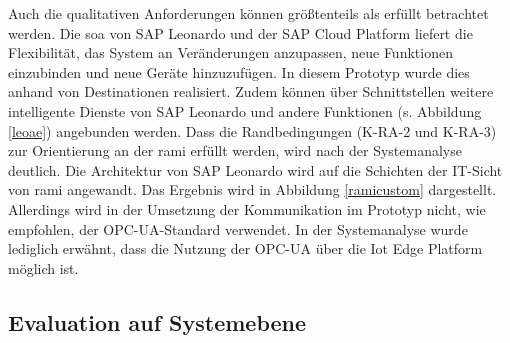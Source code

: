 Auch die qualitativen Anforderungen können größtenteils als erfüllt betrachtet werden. Die \ac{soa} von SAP Leonardo und der SAP Cloud Platform liefert die Flexibilität, das System an Veränderungen anzupassen, neue Funktionen einzubinden und neue Geräte hinzuzufügen. In diesem Prototyp wurde dies anhand von Destinationen realisiert. Zudem können über Schnittstellen weitere intelligente Dienste von SAP Leonardo und andere Funktionen (s. Abbildung \ref{leoae}) angebunden werden. Dass die Randbedingungen (K-RA-2 und K-RA-3) zur Orientierung an der \ac{rami} erfüllt werden, wird nach der Systemanalyse deutlich. Die Architektur von SAP Leonardo wird auf die Schichten der IT-Sicht von \ac{rami} angewandt. Das Ergebnis wird in Abbildung \ref{ramicustom} dargestellt. Allerdings wird in der Umsetzung der Kommunikation im Prototyp nicht, wie empfohlen, der OPC-UA-Standard verwendet. In der Systemanalyse wurde lediglich erwähnt, dass die Nutzung der OPC-UA über die Iot Edge Platform möglich ist.

\subsection{Evaluation auf Systemebene}

